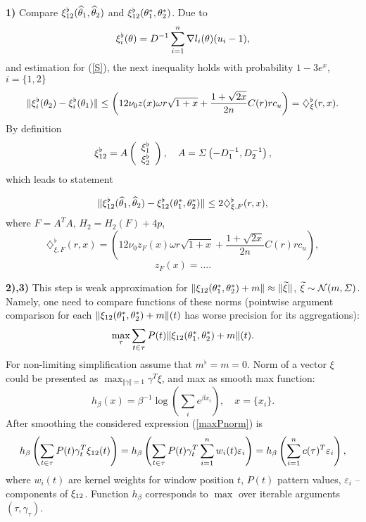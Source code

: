 \noindent\textbf{1)} Compare $\xi^{\flat}_{12}(\widehat{\theta}_1, \widehat{\theta}_2)$ and $ \xi^{\flat}_{12}(\theta_1^*, \theta_2^*)$.  
Due to  
\[
\xi^{\flat}_i(\theta) = D^{-1}  \sum_{i=1}^{n} \nabla l_i(\theta) (u_i - 1),
\]
and estimation for (\ref{S}), the next inequality holds with probability $1- 3e^{x}$, $i = \{1,2\}$
\[
\Vert \xi^{\flat}_i(\theta_2) - \xi^{\flat}_i(\theta_1) \Vert \leq 
\left(
12 \nu_0  z(x) \omega r  \sqrt{1+x} + 
\frac{1 + \sqrt{2x}}{2n}  C(r) r c_u
\right)  
 =   \diamondsuit_{\xi}^{\flat}(r,x). 
\]
By definition   
\[
\xi^{\flat}_{12} = A \left( \begin{array}{c}
\xi^{\flat}_1 \\
\xi^{\flat}_2
\end{array}
\right),
\quad 
A = \varSigma \left( - D_1^{-1}, D_2^{-1}
\right),
\]
which leads to statement 
\begin{lemma}
\[
\Vert \xi^{\flat}_{12}(\widehat{\theta}_1, \widehat{\theta}_2) - \xi^{\flat}_{12}(\theta_1^*, \theta_2^*) \Vert \leq 
  2 \diamondsuit_{\xi,F}^{\flat}(r,x), 
\]
where $F = A^T A$, $H_2 = H_2(F) + 4p$,
\[
\diamondsuit_{\xi,F}^{\flat}(r,x) = \left(
12 \nu_0  z_F(x) \omega r  \sqrt{1+x} + 
\frac{1 + \sqrt{2x}}{2n}  C(r) r c_u
\right),
\]
\[
z_F(x) = \ldots.
\]
\end{lemma}

\noindent\textbf{2),3)} This step is weak approximation for $\Vert  \xi_{12}(\theta_1^*, \theta_2^*) + m \Vert  \approx  \Vert \widetilde{\xi} \Vert$, $\widetilde{\xi} \sim \mathcal{N}(m, \varSigma) $. Namely, one need to compare functions of these norms (pointwise argument comparison for each $\Vert  \xi_{12}(\theta_1^*, \theta_2^*) + m \Vert(t)$  has worse  precision for its aggregations):
\begin{equation}
\label{maxPnorm}
\max_{\tau} \sum_{t \in \tau} P(t)  \Vert  \xi_{12}(\theta_1^*, \theta_2^*) + m \Vert(t).
\end{equation} 
For non-limiting simplification assume that $m^{\flat} = m = 0$.
Norm of a vector $\xi$ could be presented as $\max_{\Vert\gamma \Vert = 1} \gamma^T \xi$, and max as smooth max function:
\[
h_\beta (x) = \beta^{-1} \log\left( \sum_{i} e^{\beta x_i} \right),
\quad
x = \{ x_i \}.
\]
After smoothing the considered expression (\ref{maxPnorm}) is 
\[
h_\beta \left(\sum_{t \in \tau} P(t)  \gamma_t^{T} \xi_{12}(t) \right) = 
h_\beta \left(\sum_{t \in \tau} P(t)  \gamma_t^{T} \sum_{i=1}^{n} w_i(t) \varepsilon_i \right) = 
h_\beta \left(\sum_{i = 1}^{n} c(\tau)^T \varepsilon_i \right),   
\] 
where $w_i(t)$ are kernel weights for window position $t$, $P(t)$ pattern values, $\varepsilon_i$ -- components of $\xi_{12}$. Function $h_\beta$ corresponds to $\max$ over iterable arguments  $(\tau, \gamma_\tau)$.

